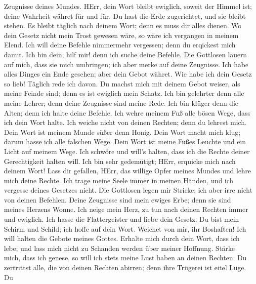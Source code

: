 Zeugnisse deines Mundes.  HErr, dein Wort bleibt ewiglich,
soweit der Himmel ist;  deine Wahrheit währet für und für.
Du hast die Erde zugerichtet, und sie bleibt stehen.  Es
bleibt täglich nach deinem Wort; denn es muss dir alles dienen.
 Wo dein Gesetz nicht mein Trost gewesen wäre, so wäre ich
vergangen in meinem Elend.  Ich will deine Befehle
nimmermehr vergessen; denn du erqickest mich damit.  Ich
bin dein, hilf mir! denn ich suche deine Befehle.  Die
Gottlosen lauern auf mich, dass sie mich umbringen; ich aber merke auf
deine Zeugnisse.  Ich habe alles Dinges ein Ende gesehen;
aber dein Gebot währet.  Wie habe ich dein Gesetz so lieb!
Täglich rede ich davon.  Du machst mich mit deinem Gebot
weiser, als meine Feinde sind; denn es ist ewiglich mein Schatz.
 Ich bin gelehrter denn alle meine Lehrer; denn deine
Zeugnisse sind meine Rede.  Ich bin klüger denn die Alten;
denn ich halte deine Befehle.  Ich wehre meinem Fuß alle
bösen Wege, dass ich dein Wort halte.  Ich weiche nicht
von deinen Rechten; denn du lehrest mich.  Dein Wort ist
meinem Munde süßer denn Honig.  Dein Wort macht mich klug;
darum hasse ich alle falschen Wege.  Dein Wort ist meine
Fußes Leuchte und ein Licht auf meinem Wege.  Ich schwöre
und will's halten, dass ich die Rechte deiner Gerechtigkeit halten will.
 Ich bin sehr gedemütigt; HErr, erquicke mich nach deinem
Wort!  Lass dir gefallen, HErr, das willige Opfer meines
Mundes und lehre mich deine Rechte.  Ich trage meine Seele
immer in meinen Händen, und ich vergesse deines Gesetzes nicht.
 Die Gottlosen legen mir Stricke; ich aber irre nicht von
deinen Befehlen.  Deine Zeugnisse sind mein ewiges Erbe;
denn sie sind meines Herzens Wonne.  Ich neige mein Herz,
zu tun nach deinen Rechten immer und ewiglich.  Ich hasse
die Flattergeister und liebe dein Gesetz.  Du bist mein
Schirm und Schild; ich hoffe auf dein Wort.  Weichet von
mir, ihr Boshaften! Ich will halten die Gebote meines Gottes.
 Erhalte mich durch dein Wort, dass ich lebe; und lass
mich nicht zu Schanden werden über meiner Hoffnung. 
Stärke mich, dass ich genese, so will ich stets meine Lust haben an
deinen Rechten.  Du zertrittst alle, die von deinen
Rechten abirren; denn ihre Trügerei ist eitel Lüge.  Du
